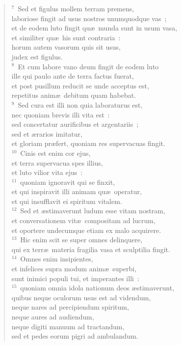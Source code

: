 \begin{flushleft}\begin{verse}${}^{7}$~Sed et figulus mollem terram premens,\\ laboriose fingit ad usus nostros unumquodque vas~;\\ et de eodem luto fingit qu\ae\ munda sunt in usum vasa,\\ et similiter qu\ae\ his sunt contraria~:\\ horum autem vasorum quis sit usus,\\ judex est figulus.\\
${}^{8}$~Et cum labore vano deum fingit de eodem luto\\ ille qui paulo ante de terra factus fuerat,\\ et post pusillum reducit se unde acceptus est,\\ repetitus anim\ae\ debitum quam habebat.\\
${}^{9}$~Sed cura est illi non quia laboraturus est,\\ nec quoniam brevis illi vita est~:\\ sed concertatur aurificibus et argentariis~;\\ sed et \ae rarios imitatur,\\ et gloriam pr\ae fert, quoniam res supervacuas fingit.\\
${}^{10}$~Cinis est enim cor ejus,\\ et terra supervacua spes illius,\\ et luto vilior vita ejus~:\\
${}^{11}$~quoniam ignoravit qui se finxit,\\ et qui inspiravit illi animam qu\ae\ operatur,\\ et qui insufflavit ei spiritum vitalem.\\
${}^{12}$~Sed et \ae stimaverunt ludum esse vitam nostram,\\ et conversationem vit\ae\ compositam ad lucrum,\\ et oportere undecumque etiam ex malo acquirere.\\
${}^{13}$~Hic enim scit se super omnes delinquere,\\ qui ex terr\ae\ materia fragilia vasa et sculptilia fingit.\\
${}^{14}$~Omnes enim insipientes,\\ et infelices supra modum anim\ae\ superbi,\\ sunt inimici populi tui, et imperantes illi~:\\
${}^{15}$~quoniam omnia idola nationum deos \ae stimaverunt,\\ quibus neque oculorum usus est ad videndum,\\ neque nares ad percipiendum spiritum,\\ neque aures ad audiendum,\\ neque digiti manuum ad tractandum,\\ sed et pedes eorum pigri ad ambulandum.\\

\end{verse}
\end{flushleft}
